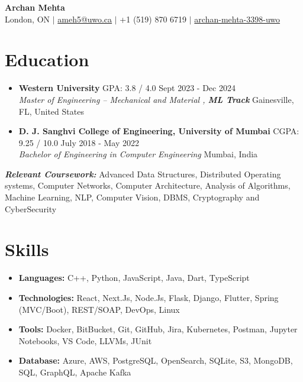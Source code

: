 \documentclass[a4paper,10pt]{article}
\begin{document}
\pagestyle{empty}

\begin{center}
    \textbf{\LARGE Archan Mehta} \\
    \vspace{7pt} 
    {London, ON} $\vert$ \href{mailto:ameh5@uwo.ca}{ameh5@uwo.ca} $\vert$ +1 (519) 870 6719 $\vert$ \href{https://linkedin.com/in/archan-mehta-3398-uwo}{\faLinkedin  { } archan-mehta-3398-uwo}
\end{center}


\vspace{-20pt}
\section*{Education}
\vspace{-5pt}

\begin{itemize}
    \item \textbf{Western University} GPA: 3.8 / 4.0  \hfill Sept 2023 - Dec 2024 \\
    \textit{Master of Engineering – Mechanical and Material ,\textbf{ ML Track}} \hfill Gainesville, FL, United States
    \vspace{5pt}

    \item \textbf{D. J. Sanghvi College of Engineering, University of Mumbai} CGPA: 9.25 / 10.0 \hfill July 2018 - May 2022 \\
    \textit{Bachelor of Engineering in Computer Engineering} \hfill Mumbai, India \\
\end{itemize}
    \vspace{-10pt}
    \textit{\textbf{Relevant Coursework:}} Advanced Data Structures, Distributed Operating systems, Computer Networks, Computer Architecture, Analysis of Algorithms, Machine Learning, NLP, Computer Vision, DBMS, Cryptography and CyberSecurity

\vspace{-10pt}
\section*{Skills}
\vspace{-5pt}
\begin{itemize}
    \item  \textbf{Languages:}  C++, Python, JavaScript, Java, Dart, TypeScript
    \item \textbf{Technologies:} React, Next.Js, Node.Js, Flask, Django, Flutter, Spring (MVC/Boot),  REST/SOAP, DevOps, Linux
    \item \textbf{Tools:} Docker, BitBucket, Git, GitHub, Jira, Kubernetes, Postman, Jupyter Notebooks, VS Code, LLVMs, JUnit
    \item \textbf{Database:} Azure, AWS, PostgreSQL, OpenSearch, SQLite, S3, MongoDB, SQL, GraphQL, Apache Kafka
\end{itemize}
\end{document}
